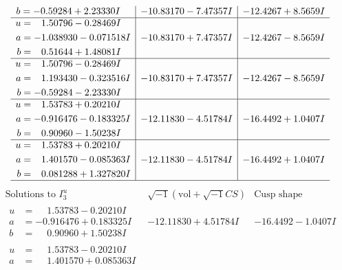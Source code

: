 \documentclass[1p]{elsarticle_modified}
\theoremstyle{definition}
\newcommand{\I}{\sqrt{-1}}
\begin{document}
$$\begin{array}{c|c|c}
\begin{aligned}
b &= -0.59284 + 2.23330 I\end{aligned}
 & -10.83170 - 7.47357 I & -12.4267 + 8.5659 I \\ \hline\begin{aligned}
u &= \phantom{-}1.50796 - 0.28469 I \\
a &= -1.038930 - 0.071518 I \\
b &= \phantom{-}0.51644 + 1.48081 I\end{aligned}
 & -10.83170 + 7.47357 I & -12.4267 - 8.5659 I \\ \hline\begin{aligned}
u &= \phantom{-}1.50796 - 0.28469 I \\
a &= \phantom{-}1.193430 - 0.323516 I \\
b &= -0.59284 - 2.23330 I\end{aligned}
 & -10.83170 + 7.47357 I & -12.4267 - 8.5659 I \\ \hline\begin{aligned}
u &= \phantom{-}1.53783 + 0.20210 I \\
a &= -0.916476 - 0.183325 I \\
b &= \phantom{-}0.90960 - 1.50238 I\end{aligned}
 & -12.11830 - 4.51784 I & -16.4492 + 1.0407 I \\ \hline\begin{aligned}
u &= \phantom{-}1.53783 + 0.20210 I \\
a &= \phantom{-}1.401570 - 0.085363 I \\
b &= \phantom{-}0.081288 + 1.327820 I\end{aligned}
 & -12.11830 - 4.51784 I & -16.4492 + 1.0407 I\\
 \hline 
 \end{array}$$\newpage$$\begin{array}{c|c|c}  
\text{Solutions to }I^u_{3}& \I (\text{vol} + \sqrt{-1}CS) & \text{Cusp shape}\\
 \hline 
\begin{aligned}
u &= \phantom{-}1.53783 - 0.20210 I \\
a &= -0.916476 + 0.183325 I \\
b &= \phantom{-}0.90960 + 1.50238 I\end{aligned}
 & -12.11830 + 4.51784 I & -16.4492 - 1.0407 I \\ \hline\begin{aligned}
u &= \phantom{-}1.53783 - 0.20210 I \\
a &= \phantom{-}1.401570 + 0.085363 I \\

\end{aligned}
\end{array}$$
\end{document}
